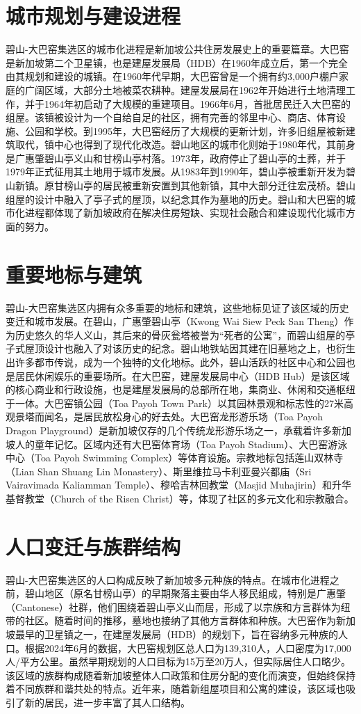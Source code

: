 \documentclass[11pt,a4paper,twoside,openany]{book}
\begin{document}
\section{城市规划与建设进程}
碧山-大巴窑集选区的城市化进程是新加坡公共住房发展史上的重要篇章。大巴窑是新加坡第二个卫星镇，也是建屋发展局（HDB）在1960年成立后，第一个完全由其规划和建设的城镇。在1960年代早期，大巴窑曾是一个拥有约3,000户棚户家庭的广阔区域，大部分土地被菜农耕种。建屋发展局在1962年开始进行土地清理工作，并于1964年初启动了大规模的重建项目。1966年6月，首批居民迁入大巴窑的组屋。该镇被设计为一个自给自足的社区，拥有完善的邻里中心、商店、体育设施、公园和学校。到1995年，大巴窑经历了大规模的更新计划，许多旧组屋被新建筑取代，镇中心也得到了现代化改造。碧山地区的城市化则始于1980年代，其前身是广惠肇碧山亭义山和甘榜山亭村落。1973年，政府停止了碧山亭的土葬，并于1979年正式征用其土地用于城市发展。从1983年到1990年，碧山亭被重新开发为碧山新镇。原甘榜山亭的居民被重新安置到其他新镇，其中大部分迁往宏茂桥。碧山组屋的设计中融入了亭子式的屋顶，以纪念其作为墓地的历史。碧山和大巴窑的城市化进程都体现了新加坡政府在解决住房短缺、实现社会融合和建设现代化城市方面的努力。

\section{重要地标与建筑}
碧山-大巴窑集选区内拥有众多重要的地标和建筑，这些地标见证了该区域的历史变迁和城市发展。在碧山，广惠肇碧山亭（Kwong Wai Siew Peck San Theng）作为历史悠久的华人义山，其后来的骨灰瓮塔被誉为“死者的公寓”，而碧山组屋的亭子式屋顶设计也融入了对该历史的纪念。碧山地铁站因其建在旧墓地之上，也衍生出许多都市传说，成为一个独特的文化地标。此外，碧山活跃的社区中心和公园也是居民休闲娱乐的重要场所。在大巴窑，建屋发展局中心（HDB Hub）是该区域的核心商业和行政设施，也是建屋发展局的总部所在地，集商业、休闲和交通枢纽于一体。大巴窑镇公园（Toa Payoh Town Park）以其园林景观和标志性的27米高观景塔而闻名，是居民放松身心的好去处。大巴窑龙形游乐场（Toa Payoh Dragon Playground）是新加坡仅存的几个传统龙形游乐场之一，承载着许多新加坡人的童年记忆。区域内还有大巴窑体育场（Toa Payoh Stadium）、大巴窑游泳中心（Toa Payoh Swimming Complex）等体育设施。宗教地标包括莲山双林寺（Lian Shan Shuang Lin Monastery）、斯里维拉马卡利亚曼兴都庙（Sri Vairavimada Kaliamman Temple）、穆哈吉林回教堂（Masjid Muhajirin）和升华基督教堂（Church of the Risen Christ）等，体现了社区的多元文化和宗教融合。

\section{人口变迁与族群结构}
碧山-大巴窑集选区的人口构成反映了新加坡多元种族的特点。在城市化进程之前，碧山地区（原名甘榜山亭）的早期聚落主要由华人移民组成，特别是广惠肇（Cantonese）社群，他们围绕着碧山亭义山而居，形成了以宗族和方言群体为纽带的社区。随着时间的推移，墓地也接纳了其他方言群体和种族。大巴窑作为新加坡最早的卫星镇之一，在建屋发展局（HDB）的规划下，旨在容纳多元种族的人口。根据2024年6月的数据，大巴窑规划区总人口为139,310人，人口密度为17,000人/平方公里。虽然早期规划的人口目标为15万至20万人，但实际居住人口略少。该区域的族群构成随着新加坡整体人口政策和住房分配的变化而演变，但始终保持着不同族群和谐共处的特点。近年来，随着新组屋项目和公寓的建设，该区域也吸引了新的居民，进一步丰富了其人口结构。
\end{document}

